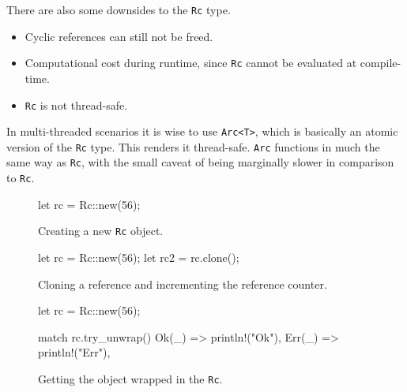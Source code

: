 \documentclass[twocolumn]{article}
\begin{document}
There are also some downsides to the \texttt{Rc} type.
\begin{itemize}
        \item Cyclic references can still not be freed.
        \item Computational cost during runtime, since \texttt{Rc} cannot be evaluated at compile-time.
        \item \texttt{Rc} is not thread-safe.
\end{itemize}
In multi-threaded scenarios it is wise to use \texttt{Arc<T>}, which is basically an atomic version of the \texttt{Rc} type.
This renders it thread-safe. 
\texttt{Arc} functions in much the same way as \texttt{Rc}, with the small caveat of being marginally slower in comparison to \texttt{Rc}.
\begin{figure}
\begin{rustcode}
let rc = Rc::new(56);
\end{rustcode}
\vspace{-2em}
\caption{Creating a new \texttt{Rc} object.}
\label{rc-new}
\end{figure}
\begin{figure}
\begin{rustcode}
let rc = Rc::new(56);
let rc2 = rc.clone();
\end{rustcode}
\vspace{-2em}
\caption{Cloning a reference and incrementing the reference counter.}
\label{rc-clone}
\end{figure}
\begin{figure}
\begin{rustcode}
let rc = Rc::new(56);

match rc.try_unwrap() {
    Ok(_) => println!("Ok"),
    Err(_) => println!("Err"),
}        
\end{rustcode}
\vspace{-2em}
\caption{Getting the object wrapped in the \texttt{Rc}.}
\label{rc-unwrap}
\end{figure}
\end{document}
